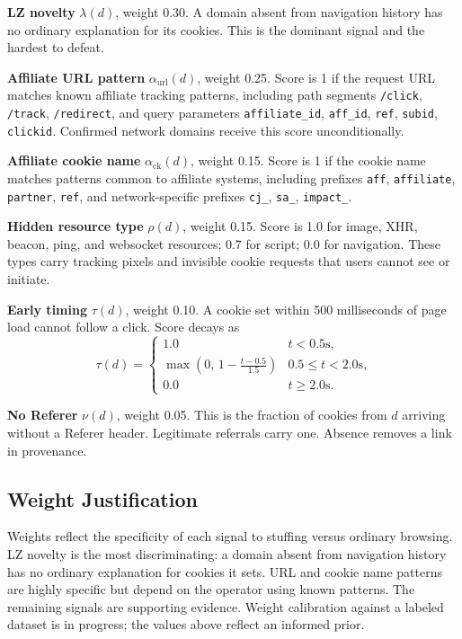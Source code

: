 \documentclass[10pt,twocolumn,letterpaper]{article}
\begin{document}
\textbf{LZ novelty} $\lambda(d)$, weight 0.30. A domain absent from
navigation history has no ordinary explanation for its cookies. This is
the dominant signal and the hardest to defeat.

\textbf{Affiliate URL pattern} $\alpha_{\mathrm{url}}(d)$, weight 0.25.
Score is 1 if the request URL matches known affiliate tracking patterns,
including path segments \texttt{/click}, \texttt{/track},
\texttt{/redirect}, and query parameters \texttt{affiliate\_id},
\texttt{aff\_id}, \texttt{ref}, \texttt{subid}, \texttt{clickid}.
Confirmed network domains receive this score unconditionally.

\textbf{Affiliate cookie name} $\alpha_{\mathrm{ck}}(d)$, weight 0.15.
Score is 1 if the cookie name matches patterns common to affiliate systems,
including prefixes \texttt{aff}, \texttt{affiliate}, \texttt{partner},
\texttt{ref}, and network-specific prefixes \texttt{cj\_}, \texttt{sa\_},
\texttt{impact\_}.

\textbf{Hidden resource type} $\rho(d)$, weight 0.15. Score is 1.0 for
image, XHR, beacon, ping, and websocket resources; 0.7 for script; 0.0
for navigation. These types carry tracking pixels and invisible cookie
requests that users cannot see or initiate.

\textbf{Early timing} $\tau(d)$, weight 0.10. A cookie set within 500
milliseconds of page load cannot follow a click. Score decays as
\[
  \tau(d) =
  \begin{cases}
    1.0 & t < 0.5\text{s,} \\
    \max\!\left(0,\, 1 - \frac{t - 0.5}{1.5}\right) & 0.5 \leq t < 2.0\text{s,} \\
    0.0 & t \geq 2.0\text{s.}
  \end{cases}
\]

\textbf{No Referer} $\nu(d)$, weight 0.05. This is the fraction of cookies
from $d$ arriving without a Referer header. Legitimate referrals carry one.
Absence removes a link in provenance.

\subsection{Weight Justification}
\label{sec:weights}

Weights reflect the specificity of each signal to stuffing versus ordinary
browsing. LZ novelty is the most discriminating: a domain absent from
navigation history has no ordinary explanation for cookies it sets. URL and
cookie name patterns are highly specific but depend on the operator using
known patterns. The remaining signals are supporting evidence. Weight
calibration against a labeled dataset is in progress; the values above
reflect an informed prior.
\end{document}
